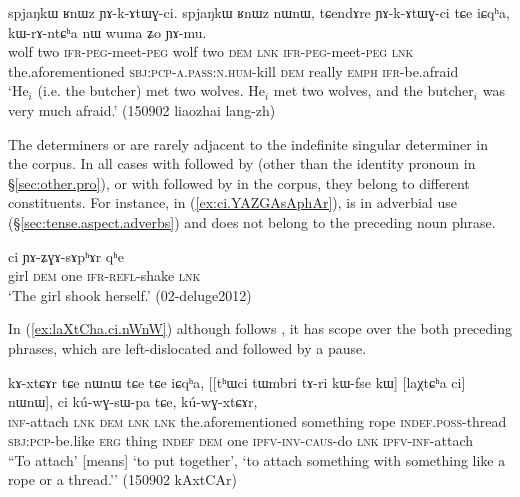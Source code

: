 \largerpage
\begin{exe} 
\ex \label{ex:RnWz.nWnW} 
 \gll spjaŋkɯ ʁnɯz ɲɤ-k-ɤtɯɣ-ci. spjaŋkɯ ʁnɯz nɯnɯ, tɕendɤre ɲɤ-k-ɤtɯɣ-ci tɕe iɕqʰa, kɯ-rɤ-ntɕʰa nɯ wuma ʑo ɲɤ-mu. \\ 
 wolf two \textsc{ifr}-\textsc{peg}-meet-\textsc{peg}  wolf two \textsc{dem} \textsc{lnk} \textsc{ifr}-\textsc{peg}-meet-\textsc{peg} \textsc{lnk} the.aforementioned \textsc{sbj}:\textsc{pcp}-\textsc{a}.\textsc{pass}:\textsc{n}.\textsc{hum}-kill \textsc{dem} really \textsc{emph} \textsc{ifr}-be.afraid \\ 
 \glt `He$_i$ (i.e. the butcher) met two wolves. He$_i$ met two wolves, and the butcher$_i$ was very much afraid.' (150902 liaozhai lang-zh) 
\end{exe}

The determiners  or  are rarely adjacent to the indefinite singular determiner  in the corpus. In all cases with  followed by  (other than the identity pronoun in §\ref{sec:other.pro}), or with  followed by  in the corpus, they belong to different constituents. For instance, in (\ref{ex:ci.YAZGAsAphAr}),  is in adverbial use (§\ref{sec:tense.aspect.adverbs}) and does not belong to the preceding noun phrase.  

\begin{exe}
\ex \label{ex:ci.YAZGAsAphAr}
\gll [tɕʰeme nɯ] ci ɲɤ-ʑɣɤ-sɤpʰɤr qʰe  \\
girl \textsc{dem} one \textsc{ifr}-\textsc{refl}-shake \textsc{lnk} \\
\glt `The girl shook herself.' (02-deluge2012) 
\end{exe}

In (\ref{ex:laXtCha.ci.nWnW}) although  follows , it has scope over the both preceding phrases, which are left-dislocated and followed by a pause.

\begin{exe}
\ex \label{ex:laXtCha.ci.nWnW}
\gll  kɤ-xtɕɤr tɕe nɯnɯ tɕe tɕe iɕqʰa, [[tʰɯci tɯmbri tɤ-ri kɯ-fse kɯ] [laχtɕʰa ci] nɯnɯ], ci kú-wɣ-sɯ-pa tɕe, kú-wɣ-xtɕɤr, \\
\textsc{inf}-attach \textsc{lnk} \textsc{dem} \textsc{lnk} \textsc{lnk} the.aforementioned something rope \textsc{indef}.\textsc{poss}-thread \textsc{sbj}:\textsc{pcp}-be.like \textsc{erg} thing \textsc{indef} \textsc{dem} one \textsc{ipfv}-\textsc{inv}-\textsc{caus}-do \textsc{lnk} \textsc{ipfv}-\textsc{inf}-attach \\
\glt ``To attach' [means] `to put together', `to attach something with something like a rope or a thread.''  (150902 kAxtCAr)
\end{exe}


